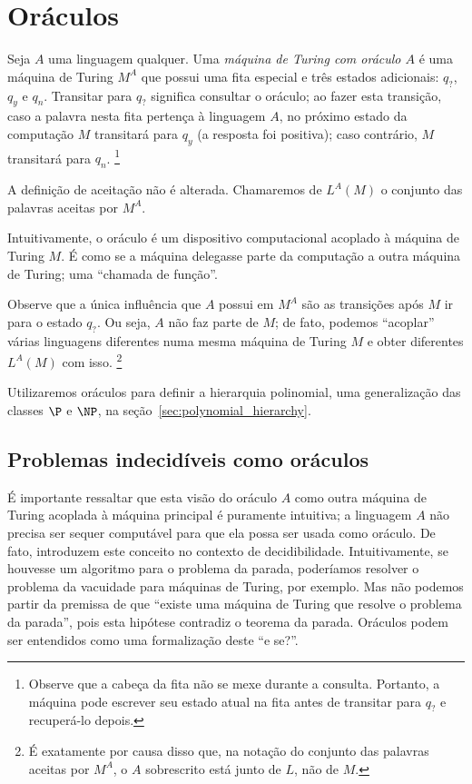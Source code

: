 \chapter{Oráculos}

\begin{definition}
    Seja $A$ uma linguagem qualquer.
    Uma \emph{máquina de Turing com oráculo $A$}
    é uma máquina de Turing $M^A$ que possui uma fita especial
    e três estados adicionais: $q_?$, $q_y$ e $q_n$.
    Transitar para $q_?$ significa consultar o oráculo;
    ao fazer esta transição,
    caso a palavra nesta fita pertença à linguagem $A$,
    no próximo estado da computação $M$ transitará para $q_y$
    (a resposta foi positiva);
    caso contrário, $M$ transitará para $q_n$.%
    \footnote{
        Observe que a cabeça da fita não se mexe durante a consulta.
        Portanto, a máquina pode escrever seu estado atual na fita
        antes de transitar para $q_?$ e recuperá-lo depois.
    }

    A definição de aceitação não é alterada.
    Chamaremos de $L^A(M)$ o conjunto das palavras aceitas por $M^A$.
\end{definition}

Intuitivamente, o oráculo é um dispositivo computacional
acoplado à máquina de Turing $M$.
É como se a máquina delegasse parte da computação
a outra máquina de Turing;
uma ``chamada de função''.

Observe que a única influência que $A$ possui em $M^A$
são as transições após $M$ ir para o estado $q_?$.
Ou seja, $A$ não faz parte de $M$;
de fato, podemos ``acoplar'' várias linguagens diferentes
numa mesma máquina de Turing $M$
e obter diferentes $L^A(M)$ com isso.%
\footnote{
    É exatamente por causa disso que,
    na notação do conjunto das palavras aceitas por $M^A$,
    o $A$ sobrescrito está junto de $L$, não de $M$.
}

Utilizaremos oráculos para definir a hierarquia polinomial,
uma generalização das classes $\P$ e $\NP$,
na seção~\ref{sec:polynomial_hierarchy}.

\section{Problemas indecidíveis como oráculos}

É importante ressaltar que esta visão do oráculo $A$
como outra máquina de Turing acoplada à máquina principal
é puramente intuitiva;
a linguagem $A$ não precisa ser sequer computável
para que ela possa ser usada como oráculo.
De fato, 
introduzem este conceito no contexto de decidibilidade.
Intuitivamente, se houvesse um algoritmo para o problema da parada,
poderíamos resolver o problema da vacuidade para máquinas de Turing,
por exemplo.
Mas não podemos partir da premissa de que
``existe uma máquina de Turing que resolve o problema da parada'',
pois esta hipótese contradiz o teorema da parada.
Oráculos podem ser entendidos como uma formalização deste ``e se?''.

